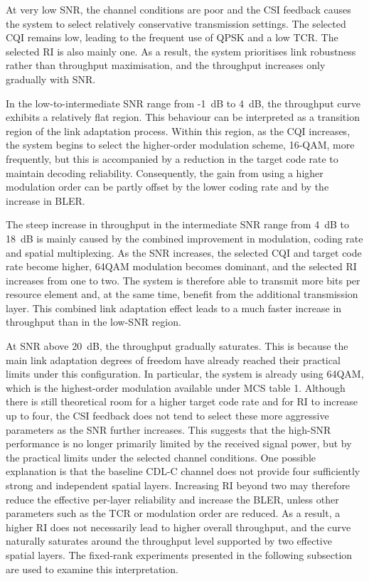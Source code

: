 \documentclass[a4paper,12pt,onecolumn]{article}
\begin{document}
			At very low SNR, the channel conditions are poor and the CSI feedback causes the system to select relatively conservative transmission settings. The selected CQI remains low, leading to the frequent use of QPSK and a low TCR. The selected RI is also mainly one. As a result, the system prioritises link robustness rather than throughput maximisation, and the throughput increases only gradually with SNR.
			
			In the low-to-intermediate SNR range from -1~dB to 4~dB, the throughput curve exhibits a relatively flat region. This behaviour can be interpreted as a transition region of the link adaptation process. Within this region, as the CQI increases, the system begins to select the higher-order modulation scheme, 16-QAM, more frequently, but this is accompanied by a reduction in the target code rate to maintain decoding reliability. Consequently, the gain from using a higher modulation order can be partly offset by the lower coding rate and by the increase in BLER. 

			The steep increase in throughput in the intermediate SNR range from 4~dB to 18~dB is mainly caused by the combined improvement in modulation, coding rate and spatial multiplexing. As the SNR increases, the selected CQI and target code rate become higher, 64QAM modulation becomes dominant, and the selected RI increases from one to two. The system is therefore able to transmit more bits per resource element and, at the same time, benefit from the additional transmission layer. This combined link adaptation effect leads to a much faster increase in throughput than in the low-SNR region.
				
			At SNR above 20~dB, the throughput gradually saturates. This is because the main link adaptation degrees of freedom have already reached their practical limits under this configuration. In particular, the system is already using 64QAM, which is the highest-order modulation available under MCS table 1. Although there is still theoretical room for a higher target code rate and for RI to increase up to four, the CSI feedback does not tend to select these more aggressive parameters as the SNR further increases. This suggests that the high-SNR performance is no longer primarily limited by the received signal power, but by the practical limits under the selected channel conditions. One possible explanation is that the baseline CDL-C channel does not provide four sufficiently strong and independent spatial layers. Increasing RI beyond two may therefore reduce the effective per-layer reliability and increase the BLER, unless other parameters such as the TCR or modulation order are reduced. As a result, a higher RI does not necessarily lead to higher overall throughput, and the curve naturally saturates around the throughput level supported by two effective spatial layers. The fixed-rank experiments presented in the following subsection are used to examine this interpretation.
\end{document}
